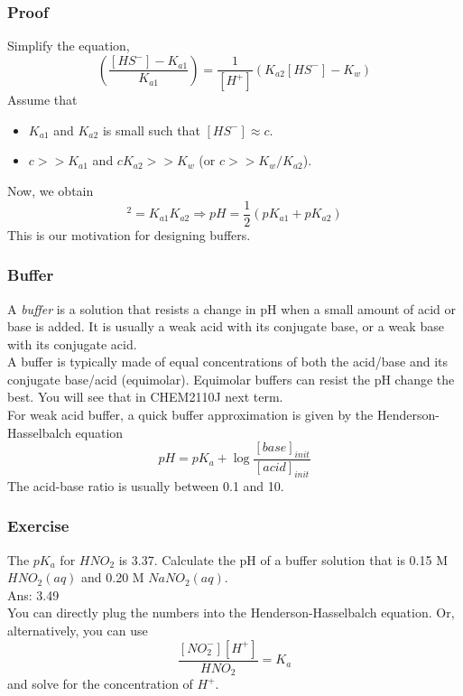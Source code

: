 \documentclass[aspectratio=169]{beamer}
\def\blankline{\\[12pt]}
\begin{document}
\begin{frame}
  \frametitle{Proof}
  Simplify the equation, 
  \begin{equation*}
    [H^+]\left(\frac{[HS^-] - K_{a1}}{K_{a1}}\right) = \frac{1}{[H^+]}\left(K_{a2}[HS^-] - K_w\right)
  \end{equation*}
  Assume that
  \begin{itemize}
    \item $K_{a1}$ and $K_{a2}$ is small such that $[HS^-]\approx c$.
    \item $c >> K_{a1}$ and $c K_{a2} >> K_w$ (or $c >> K_w/K_{a2}$).
  \end{itemize}
  Now, we obtain
  \begin{equation*}
    [H^+]^2 = K_{a1}K_{a2} \Rightarrow pH = \frac{1}{2}(pK_{a1} + pK_{a2})
  \end{equation*}
  This is our motivation for designing buffers.
\end{frame}
\begin{frame}
  \frametitle{Buffer}
  A \textit{buffer} is a solution that resists a change in pH when a small amount of acid or base is added. It is usually a 
  weak acid with its conjugate base, or a weak base with its conjugate acid.
  \blankline
  A buffer is typically made of equal concentrations of both the acid/base and its conjugate base/acid (equimolar).
  Equimolar buffers can resist the pH change the best. You will see that in CHEM2110J next term.
  \blankline
  For weak acid buffer, a quick buffer approximation is given by the Henderson-Hasselbalch equation
  \begin{equation*}
    pH = pK_a + \log\frac{[base]_{init}}{[acid]_{init}}
  \end{equation*} 
  The acid-base ratio is usually between 0.1 and 10. 
\end{frame}
\begin{frame}
  \frametitle{Exercise}
  The $pK_a$ for $HNO_2$ is 3.37. Calculate the pH of a buffer solution that is 0.15 M $HNO_2(aq)$ and 0.20 M $NaNO_2(aq)$. 
  \pause
  \blankline
  Ans: 3.49 \\
  You can directly plug the numbers into the Henderson-Hasselbalch equation. Or, alternatively, 
  you can use 
  \begin{equation*}
    \frac{[NO_2^-][H^+]}{HNO_2} = K_a
  \end{equation*}
  and solve for the concentration of $H^+$.
\end{frame}
\end{document}
